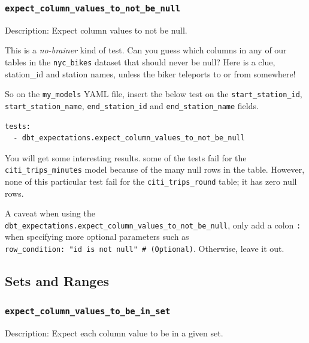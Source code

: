 \documentclass[
]{book}
\begin{document}
\hypertarget{expect_column_values_to_not_be_null}{%
\subsubsection{\texorpdfstring{\texttt{expect\_column\_values\_to\_not\_be\_null}}{expect\_column\_values\_to\_not\_be\_null}}\label{expect_column_values_to_not_be_null}}

Description: Expect column values to not be null.

This is a \emph{no-brainer} kind of test. Can you guess which columns in any of our tables in the \texttt{nyc\_bikes} dataset that should never be null? Here is a clue, station\_id and station names, unless the biker teleports to or from somewhere!

So on the \texttt{my\_models} YAML file, insert the below test on the \texttt{start\_station\_id}, \texttt{start\_station\_name}, \texttt{end\_station\_id} and \texttt{end\_station\_name} fields.

\begin{verbatim}
tests:
  - dbt_expectations.expect_column_values_to_not_be_null
\end{verbatim}

You will get some interesting results. some of the tests fail for the \texttt{citi\_trips\_minutes} model because of the many null rows in the table. However, none of this particular test fail for the \texttt{citi\_trips\_round} table; it has zero null rows.

A caveat when using the \texttt{dbt\_expectations.expect\_column\_values\_to\_not\_be\_null}, only add a colon \texttt{:} when specifying more optional parameters such as \texttt{row\_condition:\ "id\ is\ not\ null"\ \#\ (Optional)}. Otherwise, leave it out.

\hypertarget{sets-and-ranges}{%
\subsection{Sets and Ranges}\label{sets-and-ranges}}

\hypertarget{expect_column_values_to_be_in_set}{%
\subsubsection{\texorpdfstring{\texttt{expect\_column\_values\_to\_be\_in\_set}}{expect\_column\_values\_to\_be\_in\_set}}\label{expect_column_values_to_be_in_set}}

Description: Expect each column value to be in a given set.
\end{document}
